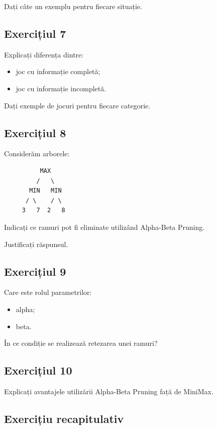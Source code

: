 \documentclass[12pt,a4paper]{article}
\begin{document}
Dați câte un exemplu pentru fiecare situație.

\subsection{Exercițiul 7}

Explicați diferența dintre:

\begin{itemize}
\item joc cu informație completă;
\item joc cu informație incompletă.
\end{itemize}

Dați exemple de jocuri pentru fiecare categorie.

\subsection{Exercițiul 8}

Considerăm arborele:

\begin{verbatim}
          MAX
         /   \
       MIN   MIN
      / \    / \
     3   7  2   8
\end{verbatim}

Indicați ce ramuri pot fi eliminate utilizând Alpha-Beta Pruning.

Justificați răspunsul.

\subsection{Exercițiul 9}

Care este rolul parametrilor:

\begin{itemize}
\item alpha;
\item beta.
\end{itemize}

În ce condiție se realizează retezarea unei ramuri?

\subsection{Exercițiul 10}

Explicați avantajele utilizării Alpha-Beta Pruning față de MiniMax.

\subsection{Exercițiu recapitulativ}
\end{document}
